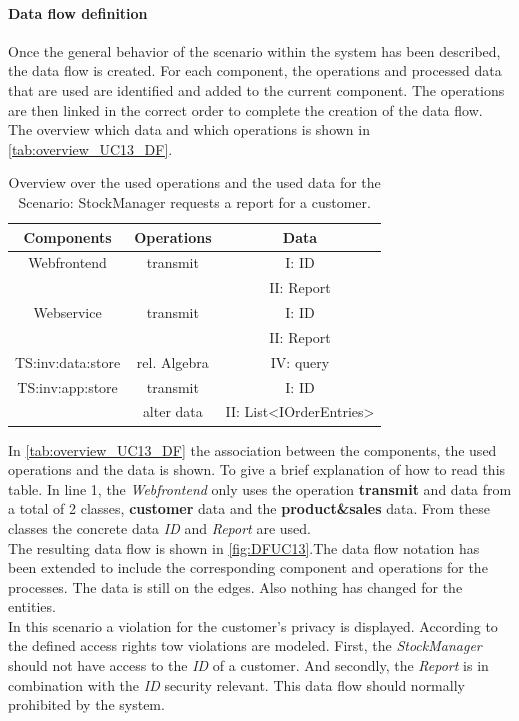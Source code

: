 \paragraph{Data flow definition}
Once the general behavior of the scenario within the system has been described, the data flow is created. For each component, the operations and processed data that are used are identified and added to the current component. The operations are then linked in the correct order to complete the creation of the data flow.\\
The overview which data and which operations is shown in \autoref{tab:overview_UC13_DF}.
\begin{table}
\begin{tabular}{|c|c|c|}
\hline 
Components & Operations & Data \\ 
\hline 
Webfrontend & transmit & I: ID  \\
& & II: Report \\
\hline 
Webservice & transmit & I: ID \\ 
& & II: Report \\ 
\hline 
TS:inv:data:store & rel. Algebra & IV: query \\ 
\hline 
TS:inv:app:store & transmit & I: ID  \\ 
& alter data & II: List<IOrderEntries>  \\
\hline 
\end{tabular} 
\caption{Overview over the used operations and the used data for the Scenario: StockManager requests a report for a customer.}
\label{tab:overview_UC13_DF}
\end{table}
In \autoref{tab:overview_UC13_DF} the association between the components, the used operations and the data is shown. To give a brief explanation of how to read this table. In line 1, the \textit{Webfrontend} only uses the operation \textbf{transmit} and data from a total of 2 classes,  \textbf{customer} data and the \textbf{product\&sales} data. From these classes the concrete data \textit{ID} and \textit{Report} are used.\\
The resulting data flow is shown in \autoref{fig:DFUC13}.The data flow notation has been extended to include the corresponding component and operations for the processes. The data is still on the edges. Also nothing has changed for the entities.\\
In this scenario a violation for the customer's privacy is displayed. According to the defined access rights tow violations are modeled. First, the \textit{StockManager} should not have access to the \textit{ID} of a customer. And secondly, the \textit{Report} is in combination with the \textit{ID} security relevant. This  data flow should normally prohibited by the system.
